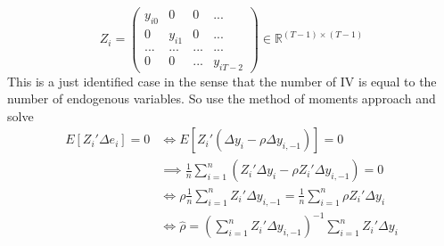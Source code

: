 \documentclass[12pt]{article}
\theoremstyle{definition}
\theoremstyle{property}
\theoremstyle{assumption}
\theoremstyle{example}
\theoremstyle{comment}
\begin{document}
\[
Z_i = \begin{pmatrix}y_{i0}& 0 & 0 & ... \\ 0 & y_{i1}& 0 & ... \\ ... & ... &...&...\\ 0 & 0 & ... & y_{iT-2} \end{pmatrix}\in\mathbb{R}^{(T-1)\times (T-1)}
\]
This is a just identified case in the sense that the number of IV is equal to the number of endogenous variables. So use the method of moments approach and solve
\begin{align*}
E[Z_i'\Delta {e}_i]=0&\iff E[Z_i'(\Delta {y}_i - \rho\Delta{y}_{i,-1})]=0\\
&\implies \frac{1}{n}\sum_{i=1}^n(Z_i'\Delta {y}_i - \rho Z_i'\Delta {y}_{i,-1})=0\\
&\iff \rho \frac{1}{n}\sum_{i=1}^n  Z_i'\Delta {y}_{i,-1}=  \frac{1}{n}\sum_{i=1}^n \rho Z_i'\Delta {y}_{i}\\
&\iff \hat{\rho}=\left(\sum_{i=1}^n  Z_i'\Delta {y}_{i,-1}\right)^{-1}\sum_{i=1}^n  Z_i'\Delta {y}_{i}
\end{align*} 
\end{document}
